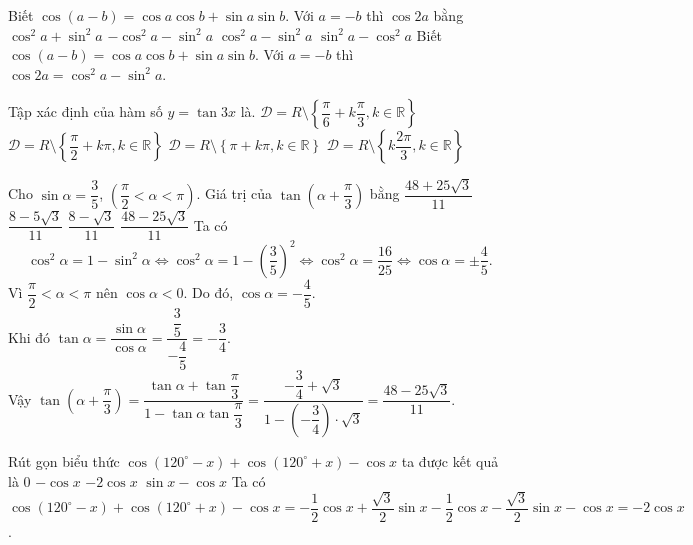 \begin{ex}%
Biết $\cos (a-b)=\cos a \cos b+\sin a \sin b$. Với $a=-b$ thì $\cos 2a$ bằng
\choice
{$\cos^2 a+\sin^2 a$}
{$-\cos^2 a-\sin^2 a$}
{\True $\cos^2 a-\sin^2 a$}
{$\sin^2 a-\cos^2 a$}
\loigiai
{
Biết $\cos (a-b)=\cos a \cos b+\sin a \sin b$. Với $a=-b$ thì $\cos 2a = \cos^2 a-\sin^2 a$.
}
\end{ex}

\begin{ex}%
Tập xác định của hàm số $y=\tan 3x$ là.
\choice
{\True $\mathscr{D}=R \setminus \left\{ \dfrac{\pi}{6}+k\dfrac{\pi}{3},k \in \mathbb{R} \right\}$}
{$\mathscr{D}=R \setminus \left\{ \dfrac{\pi}{2}+k\pi,k \in \mathbb{R} \right\}$}
{$\mathscr{D}=R \setminus \left\{ \pi +k\pi,k \in \mathbb{R} \right\}$}
{$\mathscr{D}=R \setminus \left\{ k\dfrac{2\pi}{3},k \in \mathbb{R} \right\}$}
\end{ex}


\begin{ex}%
Cho $\sin \alpha =\dfrac{3}{5}$, $\left(\dfrac{\pi}{2}<\alpha <\pi\right)$. Giá trị của $\tan \left(\alpha +\dfrac{\pi}{3} \right)$ bằng
\choice
{$\dfrac{48+25\sqrt{3}}{11}$}
{$\dfrac{8-5\sqrt{3}}{11}$}
{$\dfrac{8-\sqrt{3}}{11}$ }
{\True  $\dfrac{48-25 \sqrt{3}}{11}$}
\loigiai
{
Ta có
\[\cos^2 \alpha = 1-\sin^2 \alpha \Leftrightarrow \cos^2 \alpha = 1-\left(\dfrac{3}{5}\right)^2 \Leftrightarrow \cos^2 \alpha = \dfrac{16}{25} \Leftrightarrow \cos \alpha=\pm\dfrac{4}{5}.\]
Vì $\dfrac{\pi}{2}<\alpha <\pi$ nên $\cos \alpha<0$. Do đó, $\cos \alpha=-\dfrac{4}{5}$.\\
Khi đó $\tan\alpha = \dfrac{\sin\alpha}{\cos\alpha} = \dfrac{\dfrac{3}{5}}{-\dfrac{4}{5}} = -\dfrac{3}{4}$.\\
Vậy $\tan \left(\alpha+\dfrac{\pi}{3}\right) =\dfrac{\tan \alpha+\tan \dfrac{\pi}{3}}{1-\tan \alpha \tan \dfrac{\pi}{3}}=\dfrac{-\dfrac{3}{4}+\sqrt{3}}{1-\left(-\dfrac{3}{4}\right)\cdot \sqrt{3}} = \dfrac{48-25 \sqrt{3}}{11}$.
}
\end{ex}

\begin{ex}%
Rút gọn biểu thức $\cos \left(120^\circ- x\right)+\cos \left(120^\circ +x\right)-\cos x$ ta được kết quả là
\choice
{$0$}
{$-\cos x$}
{\True $-2\cos x$}
{$\sin x-\cos x$}
\loigiai
{
Ta có $\cos \left(120^\circ -x\right)+\cos \left(120^\circ +x\right)-\cos x =-\dfrac{1}{2}\cos x+\dfrac{\sqrt{3}}{2}\sin x-\dfrac{1}{2}\cos x - \dfrac{\sqrt{3}}{2}\sin x-\cos x =-2\cos x$.
}
\end{ex}

